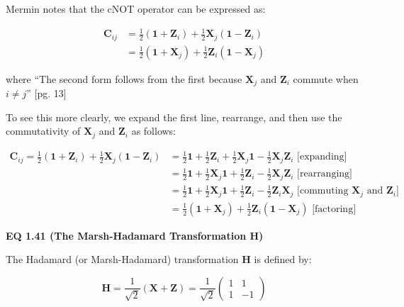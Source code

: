 \documentclass{article}
\begin{document}
Mermin notes that the cNOT operator can be expressed as:

\begin{align*}\tag{1.40}
    \bm{C}_{ij}
    &= \frac{1}{2}(\bm{1} + \bm{Z}_i)
       + \frac{1}{2}\bm{X}_j(\bm{1} - \bm{Z}_i)\\
    &= \frac{1}{2}(\bm{1} + \bm{X}_j)
       + \frac{1}{2}\bm{Z}_i(\bm{1} - \bm{X}_j)
\end{align*}

where ``The second form follows from the first because $\bm{X}_j$ and $\bm{Z}_i$ commute when $i \ne j$'' [pg. 13]

\vspace{0.125in}

To see this more clearly, we expand the first line, rearrange, and then use the commutativity of $\bm{X}_j$ and $\bm{Z}_i$ as follows:

\begin{align*}
    \bm{C}_{ij}
    = \frac{1}{2}(\bm{1} + \bm{Z}_i)
       + \frac{1}{2}\bm{X}_j(\bm{1} - \bm{Z}_i)
    & = \frac{1}{2}\bm{1} + \frac{1}{2}\bm{Z}_i
        + \frac{1}{2}\bm{X}_j\bm{1} - \frac{1}{2}\bm{X}_j\bm{Z}_i
        \text{ [expanding]}\\
    & = \frac{1}{2}\bm{1} + \frac{1}{2}\bm{X}_j\bm{1}
         + \frac{1}{2}\bm{Z}_i - \frac{1}{2}\bm{X}_j\bm{Z}_i
        \text{ [rearranging]}\\
    & = \frac{1}{2}\bm{1} + \frac{1}{2}\bm{X}_j\bm{1}
         + \frac{1}{2}\bm{Z}_i - \frac{1}{2}\bm{Z}_i\bm{X}_j
        \text{ [commuting }\bm{X}_j\text{ and }\bm{Z}_i\text{]}\\
    &= \frac{1}{2}(\bm{1} + \bm{X}_j)
       + \frac{1}{2}\bm{Z}_i(\bm{1} - \bm{X}_j)
       \text{ [factoring]}
\end{align*}

\vspace{0.125in}


\vspace{0.25in}

\textbf{EQ 1.41 (The Marsh-Hadamard Transformation $\bm{H}$)}\par

\vspace{0.25in}

The Hadamard (or Marsh-Hadamard) transformation $\bm{H}$ is defined by:

\[\tag{1.41}
\bm{H} = \frac{1}{\sqrt{2}}(\bm{X} + \bm{Z}) = \frac{1}{\sqrt{2}}\begin{pmatrix} 1 & 1 \\ 1 & -1 \end{pmatrix}
\]
\end{document}
